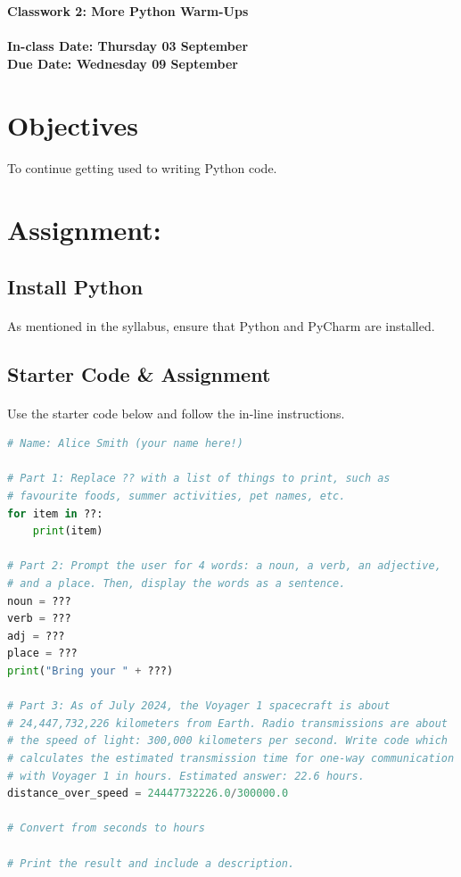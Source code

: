 \documentclass[letter,10pt]{article}
\begin{document}
    \huge
    \textbf{Classwork 2: More Python Warm-Ups}
    \normalsize
    \\ ~~ \\
    \textbf{In-class Date: Thursday 03 September} \\
    \textbf{Due Date: Wednesday 09 September}
    
    \section*{Objectives}
    \paragraph{}To continue getting used to writing Python code.
    
    \section*{Assignment:}
    \subsection{Install Python}
    \paragraph{}As mentioned in the syllabus, ensure that Python and PyCharm are installed.
    
    \subsection*{Starter Code \& Assignment}
    \paragraph{}Use the starter code below and follow the in-line instructions.
    
    \begin{lstlisting}[language=python]
# Name: Alice Smith (your name here!)

# Part 1: Replace ?? with a list of things to print, such as
# favourite foods, summer activities, pet names, etc.
for item in ??:
    print(item)

# Part 2: Prompt the user for 4 words: a noun, a verb, an adjective,
# and a place. Then, display the words as a sentence.
noun = ???
verb = ???
adj = ???
place = ???
print("Bring your " + ???)

# Part 3: As of July 2024, the Voyager 1 spacecraft is about
# 24,447,732,226 kilometers from Earth. Radio transmissions are about
# the speed of light: 300,000 kilometers per second. Write code which
# calculates the estimated transmission time for one-way communication
# with Voyager 1 in hours. Estimated answer: 22.6 hours.
distance_over_speed = 24447732226.0/300000.0

# Convert from seconds to hours

# Print the result and include a description.

    \end{lstlisting}
    
\end{document}
